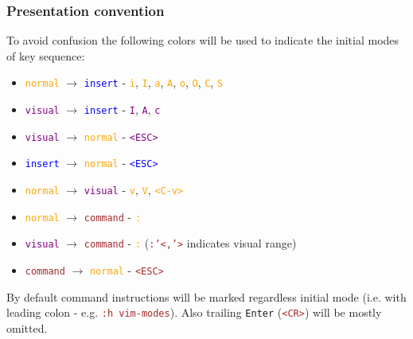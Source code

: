 \documentclass{beamer}
\newcommand{\vimmode}[1]{\texttt{#1}}
\newcommand{\viminsert}[1]{\texttt{\textcolor{blue}{#1}}}
\newcommand{\vimnormal}[1]{\texttt{\textcolor{orange}{#1}}}
\newcommand{\vimcommand}[1]{\texttt{\textcolor{brown}{#1}}}
\newcommand{\vimvisual}[1]{\texttt{\textcolor{purple}{#1}}}
\newcommand{\vimkey}[1]{\textless{}#1\textgreater{}}
\begin{document}
\begin{frame}[fragile]
    \frametitle{Presentation convention}
    To avoid confusion the following colors will be used to indicate the initial modes of key sequence:
    \begin{itemize}
        \item \vimnormal{\vimmode{normal}} $\rightarrow$ \viminsert{\vimmode{insert}} - \vimnormal{i}, \vimnormal{I}, \vimnormal{a}, \vimnormal{A}, \vimnormal{o}, \vimnormal{O}, \vimnormal{C}, \vimnormal{S}
        \item \vimvisual{\vimmode{visual}} $\rightarrow$ \viminsert{\vimmode{insert}} - \vimvisual{I}, \vimvisual{A}, \vimvisual{c}
        \item \vimvisual{\vimmode{visual}} $\rightarrow$ \vimnormal{\vimmode{normal}} - \vimvisual{\vimkey{ESC}}
        \item \viminsert{\vimmode{insert}} $\rightarrow$ \vimnormal{\vimmode{normal}} - \viminsert{\vimkey{ESC}}
        \item \vimnormal{\vimmode{normal}} $\rightarrow$ \vimvisual{\vimmode{visual}} - \vimnormal{v}, \vimnormal{V}, \vimnormal{\vimkey{C-v}}
        \item \vimnormal{\vimmode{normal}} $\rightarrow$ \vimcommand{command} - \vimnormal{:}
        \item \vimvisual{\vimmode{visual}} $\rightarrow$ \vimcommand{command} - \vimnormal{:} (\vimcommand{:'\textless{},'\textgreater{}} indicates visual range) 
        \item \vimcommand{command} $\rightarrow$ \vimnormal{\vimmode{normal}} - \vimcommand{\vimkey{ESC}}
    \end{itemize}
    By default command instructions will be marked regardless initial mode (i.e. with leading colon - e.g. \vimcommand{:h vim-modes}). Also trailing \texttt{Enter} (\vimcommand{\vimkey{CR}}) will be mostly omitted.
\end{frame}
\end{document}
